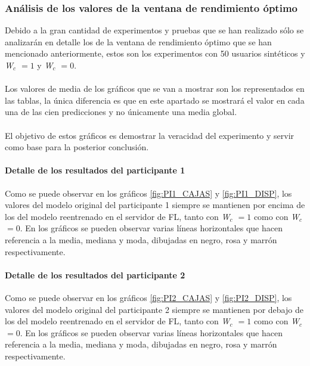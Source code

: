 \subsubsection{Análisis de los valores de la ventana de rendimiento óptimo}
Debido a la gran cantidad de experimentos y pruebas que se han realizado sólo se analizarán en detalle los de la ventana de rendimiento óptimo que se han mencionado anteriormente, estos son los experimentos con 50 usuarios sintéticos y \textit{W$_c$ $=1$} y \textit{W$_c$ $=0$}.
\\ \\
Los valores de media de los gráficos que se van a mostrar son los representados en las tablas, la única diferencia es que en este apartado se mostrará el valor en cada una de las cien predicciones y no únicamente una media global.
\\ \\
El objetivo de estos gráficos es demostrar la veracidad del experimento y servir como base para la posterior conclusión.

\paragraph{Detalle de los resultados del participante 1}
Como se puede observar en los gráficos \ref{fig:PI1_CAJAS} y \ref{fig:PI1_DISP}, los valores del modelo original del participante 1 siempre se mantienen por encima de los del modelo reentrenado en el servidor de FL, tanto con \textit{W$_c$ $=1$} como con \textit{W$_c$ $=0$}. En los gráficos se pueden observar varias líneas horizontales que hacen referencia a la media, mediana y moda, dibujadas en negro, rosa y marrón respectivamente.

\paragraph{Detalle de los resultados del participante 2}
Como se puede observar en los gráficos \ref{fig:PI2_CAJAS} y \ref{fig:PI2_DISP}, los valores del modelo original del participante 2 siempre se mantienen por debajo de los del modelo reentrenado en el servidor de FL, tanto con \textit{W$_c$ $=1$} como con \textit{W$_c$ $=0$}. En los gráficos se pueden observar varias líneas horizontales que hacen referencia a la media, mediana y moda, dibujadas en negro, rosa y marrón respectivamente.

